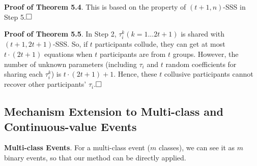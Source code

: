 \documentclass[11pt]{article}
\begin{document}
\vspace{+.5em}

\noindent \textbf{Proof of Theorem 5.4}. This is based on the property of $(t+1, n)$-SSS in Step 5.$\qed$


\vspace{+.5em}

\noindent \textbf{Proof of Theorem 5.5}. In Step 2, $\tau_i^k (k=1...2t+1)$ is shared with $(t+1, 2t+1)$-SSS. So, if $t$ participants collude, they can get at most $t\cdot(2t+1)$ equations when $t$ participants are from $t$ groups. However, the number of unknown parameters (including $\tau_i$ and $t$ random coefficients for sharing each $\tau_i^k$) is $t\cdot(2t+1)+1$. Hence, these $t$ collusive participants cannot recover other participants' $\tau_i$.$\qed$

\subsection{Mechanism Extension to Multi-class and Continuous-value Events}



\textbf{Multi-class Events}. For a multi-class event ($m$ classes), we can see it as $m$ binary events, so that our method can be directly applied.
\end{document}
